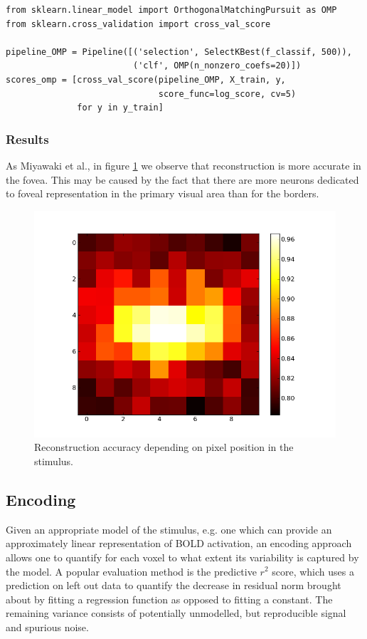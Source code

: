 \documentclass{frontiersSCNS} %
\newcounter{x}
\newcounter{y}
\newcounter{z}
\begin{document}
\begin{lstlisting}
from sklearn.linear_model import OrthogonalMatchingPursuit as OMP
from sklearn.cross_validation import cross_val_score

pipeline_OMP = Pipeline([('selection', SelectKBest(f_classif, 500)),
                         ('clf', OMP(n_nonzero_coefs=20)])
scores_omp = [cross_val_score(pipeline_OMP, X_train, y,
                              score_func=log_score, cv=5)
              for y in y_train]
\end{lstlisting}

\subsubsection{Results}

As Miyawaki et al., in figure \ref{fig:omp} we observe that reconstruction
is more accurate in the fovea. This
may be caused by the fact that there are more neurons dedicated to foveal
representation in the primary visual area than for the borders.

\begin{figure}[hbtp]
  \begin{center}
    \includegraphics[width=.3\linewidth]{img/logistic_l1_scores.png}
  \end{center}
  \caption{Reconstruction accuracy depending on pixel
           position in the stimulus.}
\label{fig:omp}
\end{figure}

\subsection{Encoding}
Given an appropriate model of the stimulus, e.g. one which can provide an approximately linear representation of BOLD activation, an encoding approach allows one to quantify for each voxel to what extent its variability is captured by the model. A popular evaluation method is the predictive \(r^2\) score, which uses a prediction on left out data to quantify the decrease in residual norm brought about by fitting a regression function as opposed to fitting a constant. %
The remaining variance consists of potentially unmodelled, but reproducible signal and spurious noise.
\end{document}
